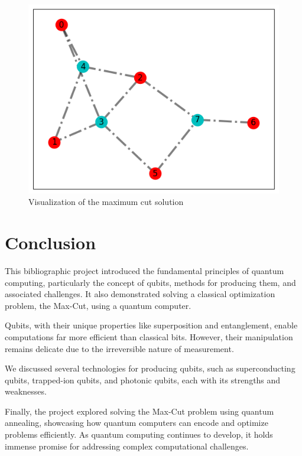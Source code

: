\documentclass{article}
\begin{document}
\begin{multicols}{2}
\begin{figure}[H]
    \centering
    \includegraphics[width = \columnwidth]{fig/solution.png}
    \caption{Visualization of the maximum cut solution}
    \label{fig:Graph_solution}
\end{figure}

\section{Conclusion}

This bibliographic project introduced the fundamental principles of quantum computing, particularly the concept of qubits, methods for producing them, and associated challenges. It also demonstrated solving a classical optimization problem, the Max-Cut, using a quantum computer.

Qubits, with their unique properties like superposition and entanglement, enable computations far more efficient than classical bits. However, their manipulation remains delicate due to the irreversible nature of measurement.

We discussed several technologies for producing qubits, such as superconducting qubits, trapped-ion qubits, and photonic qubits, each with its strengths and weaknesses.

Finally, the project explored solving the Max-Cut problem using quantum annealing, showcasing how quantum computers can encode and optimize problems efficiently. As quantum computing continues to develop, it holds immense promise for addressing complex computational challenges.

\printbibliography

\end{multicols}
\end{document}
